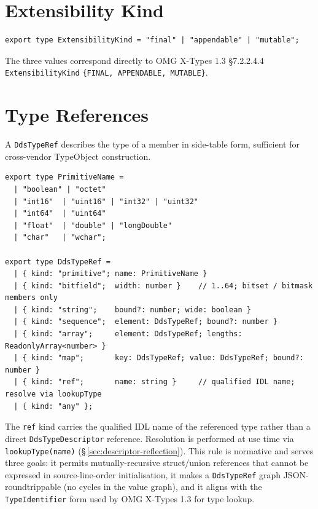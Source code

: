 \documentclass{../styles/zerodds-vendor-spec}
\begin{document}
\section{Extensibility Kind}

\begin{lstlisting}
export type ExtensibilityKind = "final" | "appendable" | "mutable";
\end{lstlisting}

The three values correspond directly to OMG X-Types 1.3 §7.2.2.4.4
\texttt{ExtensibilityKind} \texttt{\{FINAL, APPENDABLE, MUTABLE\}}.

\section{Type References}\label{sec:descriptor-typeref}

A \texttt{DdsTypeRef} describes the type of a member in
side-table form, sufficient for cross-vendor TypeObject
construction.

\begin{lstlisting}
export type PrimitiveName =
  | "boolean" | "octet"
  | "int16"  | "uint16" | "int32" | "uint32"
  | "int64"  | "uint64"
  | "float"  | "double" | "longDouble"
  | "char"   | "wchar";

export type DdsTypeRef =
  | { kind: "primitive"; name: PrimitiveName }
  | { kind: "bitfield";  width: number }    // 1..64; bitset / bitmask members only
  | { kind: "string";    bound?: number; wide: boolean }
  | { kind: "sequence";  element: DdsTypeRef; bound?: number }
  | { kind: "array";     element: DdsTypeRef; lengths: ReadonlyArray<number> }
  | { kind: "map";       key: DdsTypeRef; value: DdsTypeRef; bound?: number }
  | { kind: "ref";       name: string }     // qualified IDL name; resolve via lookupType
  | { kind: "any" };
\end{lstlisting}

The \texttt{ref} kind carries the qualified IDL name of the
referenced type rather than a direct \texttt{DdsTypeDescriptor}
reference. Resolution is performed at use time via
\texttt{lookupType(name)} (\S\,\ref{sec:descriptor-reflection}).
This rule is normative and serves three goals: it permits
mutually-recursive struct/union references that cannot be
expressed in source-line-order initialisation, it makes a
\texttt{DdsTypeRef} graph JSON-roundtrippable (no cycles in the
value graph), and it aligns with the \texttt{TypeIdentifier}
form used by OMG X-Types 1.3 for type lookup.
\end{document}
